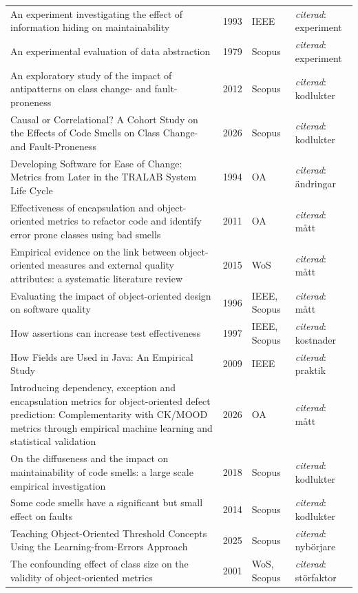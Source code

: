 \begin{longtable}{@{}%
  >{\raggedright\arraybackslash}p{}c%
  >{\raggedright\arraybackslash}p{}%
  >{\raggedright\arraybackslash}p{}@{}}
An experiment investigating the effect of information hiding on maintainability & 1993 & IEEE & \emph{citerad}: experiment \\
An experimental evaluation of data abstraction & 1979 & Scopus & \emph{citerad}: experiment \\
An exploratory study of the impact of antipatterns on class change- and fault-proneness & 2012 & Scopus & \emph{citerad}: kodlukter \\
Causal or Correlational? A Cohort Study on the Effects of Code Smells on Class Change- and Fault-Proneness & 2026 & Scopus & \emph{citerad}: kodlukter \\
Developing Software for Ease of Change: Metrics from Later in the TRALAB System Life Cycle & 1994 & OA & \emph{citerad}: ändringar \\
Effectiveness of encapsulation and object-oriented metrics to refactor code and identify error prone classes using bad smells & 2011 & OA & \emph{citerad}: mått \\
Empirical evidence on the link between object-oriented measures and external quality attributes: a systematic literature review & 2015 & WoS & \emph{citerad}: mått \\
Evaluating the impact of object-oriented design on software quality & 1996 & IEEE, Scopus & \emph{citerad}: mått \\
How assertions can increase test effectiveness & 1997 & IEEE, Scopus & \emph{citerad}: kostnader \\
How Fields are Used in Java: An Empirical Study & 2009 & IEEE & \emph{citerad}: praktik \\
Introducing dependency, exception and encapsulation metrics for object-oriented defect prediction: Complementarity with CK/MOOD metrics through empirical machine learning and statistical validation & 2026 & OA & \emph{citerad}: mått \\
On the diffuseness and the impact on maintainability of code smells: a large scale empirical investigation & 2018 & Scopus & \emph{citerad}: kodlukter \\
Some code smells have a significant but small effect on faults & 2014 & Scopus & \emph{citerad}: kodlukter \\
Teaching Object-Oriented Threshold Concepts Using the Learning-from-Errors Approach & 2025 & Scopus & \emph{citerad}: nybörjare \\
The confounding effect of class size on the validity of object-oriented metrics & 2001 & WoS, Scopus & \emph{citerad}: störfaktor \\

\end{longtable}
